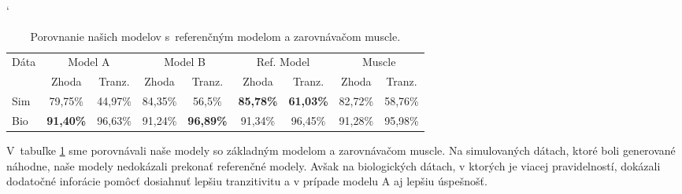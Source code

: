 \begin{table}[htp]
\catcode`
\centering
\begin{tabular}{lcccccccc}
\toprule
\multirow{2}{*}{Dáta} &
\multicolumn{2}{c}{Model A} &
\multicolumn{2}{c}{Model B } &
\multicolumn{2}{c}{Ref. Model } &
\multicolumn{2}{c}{Muscle} \\
\cmidrule(r){2-3}\cmidrule(lr){4-5}\cmidrule(lr){6-7}\cmidrule(l){8-9}
& Zhoda & Tranz. & Zhoda & Tranz. & Zhoda & Tranz. & Zhoda & Tranz.\\
\midrule
Sim & 79,75\% & 44,97\% & 84,35\% & 56,5\% & \textbf{85,78\%} & \textbf{61,03\%} & 82,72\%& 58,76\%\\
Bio & \textbf{91,40\%} & 96,63\% & 91,24\% & \textbf{96,89\%} & 91,34\% & 96,45\% & 91,28\% & 95,98\%\\
\bottomrule
\end{tabular}
\caption[Porovnanie s~existujúcimi zarovnávačmi]{Porovnanie našich modelov s~referenčným modelom a zarovnávačom muscle.}
\label{tab:success-compare}
\end{table}

V~tabuľke \ref{tab:success-compare} sme porovnávali naše modely so základným modelom a zarovnávačom muscle.
Na simulovaných dátach, ktoré boli generované náhodne, naše modely nedokázali prekonať referenčné modely. Avšak na biologických dátach, v ktorých je viacej pravidelností, dokázali dodatočné inforácie pomôcť dosiahnuť lepšiu tranzitivitu a v prípade modelu A aj lepšiu úspešnošť.






